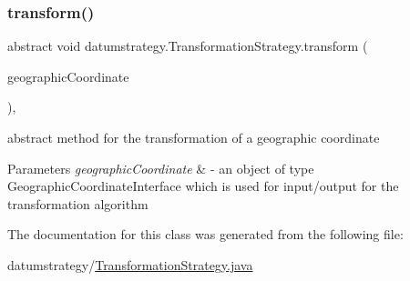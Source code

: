 \subsubsection{\texorpdfstring{transform()}{transform()}\hspace{0.1cm}{\footnotesize\ttfamily [2/2]}}
{\footnotesize\ttfamily abstract void datumstrategy.\+Transformation\+Strategy.\+transform (\begin{DoxyParamCaption}\item[{\hyperlink{classcoordinates_1_1_geographic_coordinate_interface}{Geographic\+Coordinate\+Interface}}]{geographic\+Coordinate }\end{DoxyParamCaption})\hspace{0.3cm}{\ttfamily [abstract]}, {\ttfamily [protected]}}



abstract method for the transformation of a geographic coordinate 


\begin{DoxyParams}{Parameters}
{\em geographic\+Coordinate} & -\/ an object of type Geographic\+Coordinate\+Interface which is used for input/output for the transformation algorithm \\
\hline
\end{DoxyParams}


The documentation for this class was generated from the following file\+:\begin{DoxyCompactItemize}
\item 
datumstrategy/\hyperlink{_transformation_strategy_8java}{Transformation\+Strategy.\+java}\end{DoxyCompactItemize}
